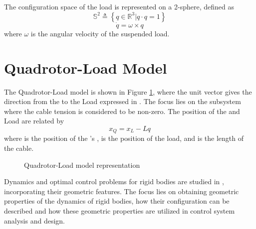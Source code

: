 The configuration space of the load is represented on a 2-sphere, defined as
\begin{equation}\label{key}
\mathbb{S}^2 \triangleq \left\lbrace q\in\mathbb{R}^{3}|q\cdot q=1\right\rbrace 
\end{equation}
\begin{equation}\label{key}
\dot{q} = \omega\times q
\end{equation}
where $ \omega $ is the angular velocity of the suspended load.

\section{Quadrotor-Load Model}	\label{sec:mod.QRLmod}
The Quadrotor-Load model is shown in Figure \ref{fig:QRLmodel}, where the unit vector  gives the direction from the  to the Load expressed in \BF. The focus lies on the subsystem where the cable tension is considered to be non-zero. The position of the  and Load are related by
\begin{equation}\label{eq:mod.xQ2xL}
x_Q=x_L-Lq
\end{equation}
where  is the position of the 's ,  is the position of the load, and  is the length of the cable.

\begin{figure}[h!]
	\centering
	\caption{Quadrotor-Load model representation\label{fig:QRLmodel}}
\end{figure}		

Dynamics and optimal control problems for rigid bodies are studied in \cite{Lee2008}, incorporating their geometric features. The focus lies on obtaining geometric properties of the dynamics of rigid bodies, how their configuration can be described and how these geometric properties are utilized in control system analysis and design. 

